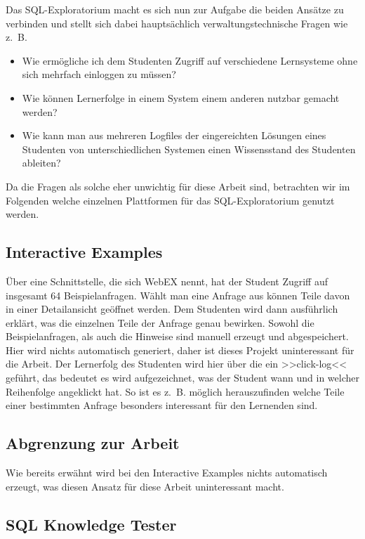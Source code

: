 Das SQL-Exploratorium macht es sich nun zur Aufgabe die beiden Ansätze zu verbinden und stellt sich dabei hauptsächlich verwaltungstechnische Fragen wie \mbox{z. B.} 

\begin{itemize}
\item Wie ermögliche ich dem Studenten Zugriff auf verschiedene Lernsysteme ohne sich mehrfach einloggen zu müssen?
\item Wie können Lernerfolge in einem System einem anderen nutzbar gemacht werden?
\item Wie kann man aus mehreren Logfiles der eingereichten Lösungen eines Studenten von unterschiedlichen Systemen einen Wissensstand des Studenten ableiten?
\end{itemize}

Da die Fragen als solche eher unwichtig für diese Arbeit sind, betrachten wir im Folgenden welche einzelnen Plattformen für das SQL-Exploratorium genutzt werden.

\subsection{Interactive Examples}

Über eine Schnittstelle, die sich WebEX nennt, hat der Student Zugriff auf insgesamt 64 Beispielanfragen. Wählt man eine Anfrage aus können Teile davon in einer Detailansicht geöffnet werden. Dem Studenten wird dann ausführlich erklärt, was die einzelnen Teile der Anfrage genau bewirken. Sowohl die Beispielanfragen, als auch die Hinweise sind manuell erzeugt und abgespeichert. Hier wird nichts automatisch generiert, daher ist dieses Projekt uninteressant für die Arbeit. Der Lernerfolg des Studenten wird hier über die ein >>click-log<< geführt, das bedeutet es wird aufgezeichnet, was der Student wann und in welcher Reihenfolge angeklickt hat. So ist es \mbox{z. B.} möglich herauszufinden welche Teile einer bestimmten Anfrage besonders interessant für den Lernenden sind.

\subsection*{Abgrenzung zur Arbeit}

Wie bereits erwähnt wird bei den Interactive Examples nichts automatisch erzeugt, was diesen Ansatz für diese Arbeit uninteressant macht.

\subsection{SQL Knowledge Tester}


